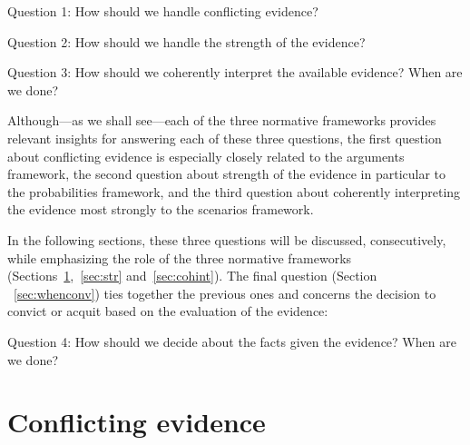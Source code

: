 \documentclass[10pt]{article}
\begin{document}
\begin{description}
	\item Question 1: How should we handle conflicting evidence?
	\item Question 2: How should we handle the strength of the evidence?
	\item Question 3: How should we coherently interpret the available evidence? 
When are we done?
\end{description}

\noindent Although---as we shall see---each of the three normative frameworks provides relevant insights for answering each of these three questions, the first question about conflicting evidence is especially closely related to the arguments framework, the second question about strength of the evidence in particular to the probabilities framework, and the third question about coherently interpreting the evidence most strongly to the scenarios framework.

In the following sections, these three questions will be discussed, consecutively, while emphasizing 
the role of the three normative frameworks (Sections~\ref{sec:conf},~\ref{sec:str} and~\ref{sec:cohint}). 
The final question (Section ~\ref{sec:whenconv}) ties together the previous ones 
and concerns the decision to convict or acquit based 
on the evaluation of the evidence:


\begin{description}
	\item Question 4: How should we decide about the facts given the evidence? When are we done?
\end{description}


\section{Conflicting evidence}
\label{sec:conf}
 	
\end{document}

